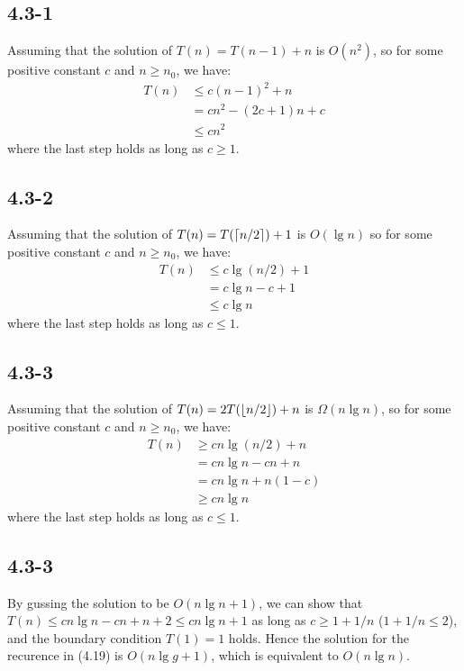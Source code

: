 \subsection{4.3-1}
    Assuming that the solution of $T(n) = T(n-1) + n$ is $O(n^2)$, so for some
    positive constant $c$ and $n \ge n_0$, we have:
    \begin{align*}
        T(n) & \le c(n - 1)^2 + n \\
             & = cn^2 - (2c + 1 )n + c \\
             & \le cn^2
    \end{align*}
    where the last step holds as long as $c \ge 1$.
\subsection{4.3-2}
    Assuming that the solution of $T(n) = T(\lceil n/2\rceil) + 1$ is $O(\lg n)$
    so for some positive constant $c$ and $n \ge n_0$, we have:
    \begin{align*}
        T(n) & \le c\lg(n/2) + 1 \\
             & = c\lg n - c + 1 \\
             & \le c\lg n
    \end{align*}
    where the last step holds as long as $c \le 1$.
\subsection{4.3-3}
    Assuming that the solution of $T(n) = 2T(\lfloor n/2\rfloor) + n$ is
    $\Omega(n\lg n)$, so for some positive constant $c$ and $n \ge n_0$, we have:
    \begin{align*}
        T(n) & \ge cn\lg(n/2) + n \\
             & = cn\lg n - cn + n \\
             & = cn\lg n + n(1-c) \\
             & \ge cn\lg n
    \end{align*}
    where the last step holds as long as $c \le 1$.
\subsection{4.3-3}
    By gussing the solution to be $O(n\lg n + 1)$, we can show that $T(n) \le
    cn\lg n - cn + n + 2 \le cn\lg n + 1$ as long as $c \ge 1 + 1/n$
    ($1 + 1/n \le 2$), and the boundary condition $T(1) = 1$ holds. Hence
    the solution for the recurence in (4.19) is $O(n\lg g + 1)$, which is
    equivalent to $O(n\lg n)$.
